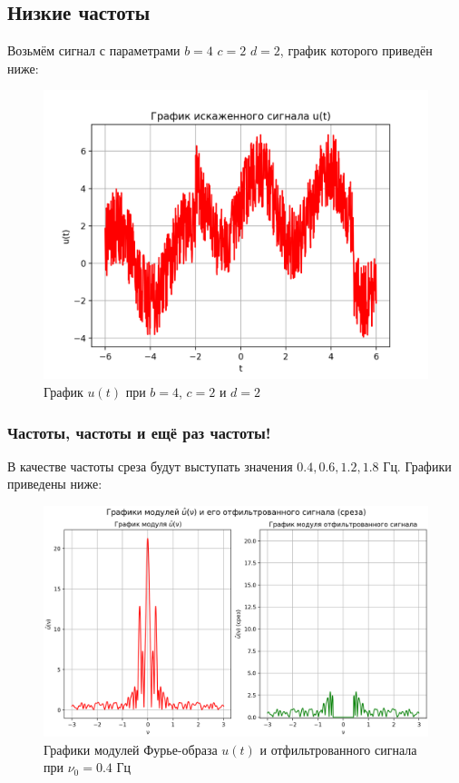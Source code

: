 \subsection{Низкие частоты}

Возьмём сигнал с параметрами $b=4$ $c=2$ $d=2$, график которого приведён ниже:

\begin{figure}[ht!]
    \centering
    \includegraphics[scale=0.5]{media/1 task/low_freq/Noisy_4_2_2.png}
    \caption{График $u(t)$ при $b=4$, $c=2$ и $d=2$}
    \label{fig:noisy_4_2_2}
\end{figure}

\subsubsection{Частоты, частоты и ещё раз частоты!}

В качестве частоты среза будут выступать значения $0.4, 0.6, 1.2, 1.8$ Гц. Графики приведены ниже:

\begin{figure}[ht!]
    \centering
    \includegraphics[scale=0.5]{media/1 task/low_freq/Fourier_Image_4_2_2_-0,4.png}
    \caption{Графики модулей Фурье-образа $u(t)$ и отфильтрованного сигнала при $\nu_0=0.4$ Гц}
    \label{fig:four_4_2_2_0.4}
\end{figure}

